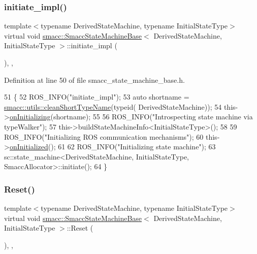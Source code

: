 \subsubsection{\texorpdfstring{initiate\+\_\+impl()}{initiate\_impl()}}
{\footnotesize\ttfamily template$<$typename Derived\+State\+Machine, typename Initial\+State\+Type$>$ \\
virtual void \hyperlink{structsmacc_1_1SmaccStateMachineBase}{smacc\+::\+Smacc\+State\+Machine\+Base}$<$ Derived\+State\+Machine, Initial\+State\+Type $>$\+::initiate\+\_\+impl (\begin{DoxyParamCaption}{ }\end{DoxyParamCaption})\hspace{0.3cm}{\ttfamily [inline]}, {\ttfamily [override]}, {\ttfamily [virtual]}}



Definition at line 50 of file smacc\+\_\+state\+\_\+machine\+\_\+base.\+h.


\begin{DoxyCode}
51     \{
52         ROS\_INFO(\textcolor{stringliteral}{"initiate\_impl"});
53         \textcolor{keyword}{auto} shortname = \hyperlink{namespacesmacc_1_1utils_aacd1975bb7cd9bec4b50e111a2ae7edb}{smacc::utils::cleanShortTypeName}(\textcolor{keyword}{typeid}(
      DerivedStateMachine));
54         this->\hyperlink{classsmacc_1_1ISmaccStateMachine_ae8c9c79ca6cd77c975f5d9cda33a6d5e}{onInitializing}(shortname);
55 
56         ROS\_INFO(\textcolor{stringliteral}{"Introspecting state machine via typeWalker"});
57         this->buildStateMachineInfo<InitialStateType>();
58 
59         ROS\_INFO(\textcolor{stringliteral}{"Initializing ROS communication mechanisms"});
60         this->\hyperlink{classsmacc_1_1ISmaccStateMachine_a95e7f71d0d88fffd0afebb1f9ccdade5}{onInitialized}();
61 
62         ROS\_INFO(\textcolor{stringliteral}{"Initializing state machine"});
63         sc::state\_machine<DerivedStateMachine, InitialStateType, SmaccAllocator>::initiate();
64     \}
\end{DoxyCode}
\mbox{\label{structsmacc_1_1SmaccStateMachineBase_a150ec7ab023a6d1d028387b2da907e9d}} 
\subsubsection{\texorpdfstring{Reset()}{Reset()}}
{\footnotesize\ttfamily template$<$typename Derived\+State\+Machine, typename Initial\+State\+Type$>$ \\
virtual void \hyperlink{structsmacc_1_1SmaccStateMachineBase}{smacc\+::\+Smacc\+State\+Machine\+Base}$<$ Derived\+State\+Machine, Initial\+State\+Type $>$\+::Reset (\begin{DoxyParamCaption}{ }\end{DoxyParamCaption})\hspace{0.3cm}{\ttfamily [inline]}, {\ttfamily [override]}, {\ttfamily [virtual]}}



